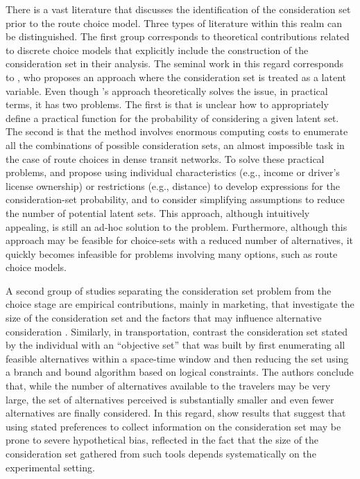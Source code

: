 \documentclass[12pt,a4paper]{article}
\begin{document}
There is a vast literature that discusses the identification of the consideration set prior to the route choice model. Three types of literature within this realm can be distinguished. The first group corresponds to theoretical contributions related to discrete choice models that explicitly include the construction of the consideration set in their analysis. The seminal work in this regard corresponds to \cite{manski1977structure}, who proposes an approach where the consideration set is treated as a latent variable. Even though \cite{manski1977structure}’s approach theoretically solves the issue, in practical terms, it has two problems. The first is that is unclear how to appropriately define a practical function for the probability of considering a given latent set. The second is that the method involves enormous computing costs to enumerate all the combinations of possible consideration sets, an almost impossible task in the case of route choices in dense transit networks. To solve these practical problems, \cite{swait1987incorporating} and \cite{ben1995discrete} propose using individual characteristics (e.g., income or driver’s license ownership) or restrictions (e.g., distance) to develop expressions for the consideration-set probability, and to consider simplifying assumptions to reduce the number of potential latent sets. This approach, although intuitively appealing, is still an ad-hoc solution to the problem. Furthermore, although this approach may be feasible for choice-sets with a reduced number of alternatives, it quickly becomes infeasible for problems involving many options, such as route choice models.

A second group of studies separating the consideration set problem from the choice stage are empirical contributions, mainly in marketing, that investigate the size of the consideration set and the factors that may influence alternative consideration \citep{brown1992consideration, hauser2014consideration}. Similarly, in transportation, \cite{hoogendoorn2004multimodal} contrast the consideration set stated by the individual with an “objective set” that was built by first enumerating all feasible alternatives within a space-time window and then reducing the set using a branch and bound algorithm based on logical constraints. The authors conclude that, while the number of alternatives available to the travelers may be very large, the set of alternatives perceived is substantially smaller and even fewer alternatives are finally considered. In this regard, \cite{villalobos2018caracterizacion} show results that suggest that using stated preferences to collect information on the consideration set may be prone to severe hypothetical bias, reflected in the fact that the size of the consideration set gathered from such tools depends systematically on the experimental setting. 
\end{document}
